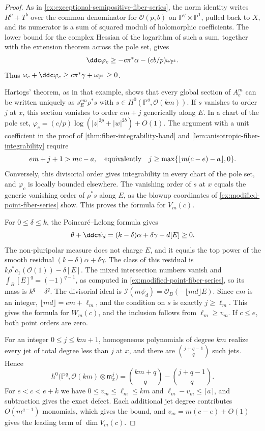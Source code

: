\begin{proof}
As in \cref{ex:exceptional-semipositive-fiber-series}, the norm identity writes $R^p+T^b$ over the common denominator for $\mathcal O(p,b)$ on $\mathbb P^q\times\mathbb P^1$, pulled back to $X$, and its numerator is a sum of squared moduli of holomorphic coefficients. The lower bound for the complex Hessian of the logarithm of such a sum, together with the extension theorem across the pole set, gives
\[
 \ddc\varphi_c\geq-c\pi^*\alpha-(cb/p)\omega_{\mathbb P^1}.
\]
Thus $\omega_c+\ddc\varphi_c\geq c\pi^*\gamma+\omega_{\mathbb P^1}\geq0$.

Hartogs' theorem, as in that example, shows that every global section of $A_e^m$ can be written uniquely as $s_E^{em}\rho^*s$ with $s\in H^0(\mathbb P^q,\mathcal O(km))$. If $s$ vanishes to order $j$ at $x$, this section vanishes to order $em+j$ generically along $E$. In a chart of the pole set, $\varphi_c=(c/p)\log(|z|^{2p}+|w|^{2b})+O(1)$. The argument with a unit coefficient in the proof of \cref{thm:fiber-integrability-band} and \cref{lem:anisotropic-fiber-integrability} require
\[
 em+j+1>mc-a,
 \quad\hbox{equivalently}\quad
 j\geq\max\{\lfloor m(c-e)-a\rfloor,0\}.
\]
Conversely, this divisorial order gives integrability in every chart of the pole set, and $\varphi_c$ is locally bounded elsewhere. The vanishing order of $s$ at $x$ equals the generic vanishing order of $\rho^*s$ along $E$, as the blowup coordinates of \cref{ex:modified-point-fiber-series} show. This proves the formula for $V_m(c)$.

For $0\leq\delta\leq k$, the Poincar\'e--Lelong formula gives
\[
 \theta+\ddc\psi_d=(k-\delta)\alpha+\delta\gamma+d[E]\geq0.
\]
The non-pluripolar measure does not charge $E$, and it equals the top power of the smooth residual $(k-\delta)\alpha+\delta\gamma$. The class of this residual is $k\rho^*c_1(\mathcal O(1))-\delta[E]$. The mixed intersection numbers vanish and $\int_B[E]^q=(-1)^{q-1}$, as computed in \cref{ex:modified-point-fiber-series}, so its mass is $k^q-\delta^q$. The divisorial ideal is $\mathcal I(m\psi_d)=\mathcal O_B(-\lfloor md\rfloor E)$. Since $em$ is an integer, $\lfloor md\rfloor=em+\ell_m$, and the condition on $s$ is exactly $j\geq\ell_m$. This gives the formula for $W_m(c)$, and the inclusion follows from $\ell_m\geq v_m$. If $c\leq e$, both point orders are zero.

For an integer $0\leq j\leq km+1$, homogeneous polynomials of degree $km$ realize every jet of total degree less than $j$ at $x$, and there are $\binom{j+q-1}{q}$ such jets. Hence
\[
 h^0\bigl(\mathbb P^q,\mathcal O(km)\otimes\mathfrak m_x^j\bigr)
   =\binom{km+q}{q}-\binom{j+q-1}{q}.
\]
For $e<c<e+k$ we have $0\leq v_m\leq\ell_m\leq km$ and $\ell_m-v_m\leq\lceil a\rceil$, and subtraction gives the exact defect. Each additional jet degree contributes $O(m^{q-1})$ monomials, which gives the bound, and $v_m=m(c-e)+O(1)$ gives the leading term of $\dim V_m(c)$.


\end{proof}
